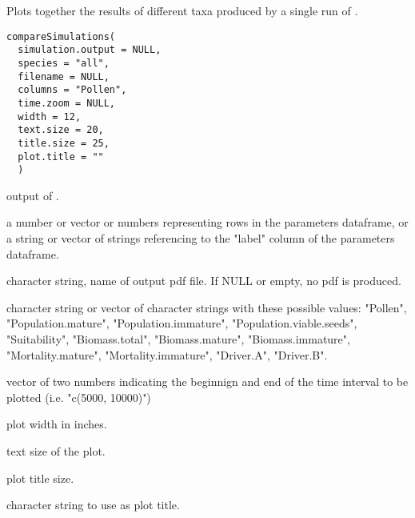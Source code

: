 \documentclass[letterpaper]{book}
\begin{document}
%
\begin{Description}\relax
Plots together the results of different taxa produced by a single run of .
\end{Description}
%
\begin{Usage}
\begin{verbatim}
compareSimulations(
  simulation.output = NULL,
  species = "all",
  filename = NULL,
  columns = "Pollen",
  time.zoom = NULL,
  width = 12,
  text.size = 20,
  title.size = 25,
  plot.title = ""
  )
\end{verbatim}
\end{Usage}
%
\begin{Arguments}
\begin{ldescription}
\item[\code{simulation.output}] output of .

\item[\code{species}] a number or vector or numbers representing rows in the parameters dataframe, or a string or vector of strings referencing to the "label" column of the parameters dataframe.

\item[\code{filename}] character string, name of output pdf file. If NULL or empty, no pdf is produced.

\item[\code{columns}] character string or vector of character strings with these possible values: "Pollen", "Population.mature", "Population.immature", "Population.viable.seeds", "Suitability", "Biomass.total", "Biomass.mature", "Biomass.immature", "Mortality.mature", "Mortality.immature", "Driver.A", "Driver.B".

\item[\code{time.zoom}] vector of two numbers indicating the beginnign and end of the time interval to be plotted (i.e. "c(5000, 10000)")

\item[\code{width}] plot width in inches.

\item[\code{text.size}] text size of the plot.

\item[\code{title.size}] plot title size.

\item[\code{plot.title}] character string to use as plot title.
\end{ldescription}
\end{Arguments}
\end{document}
